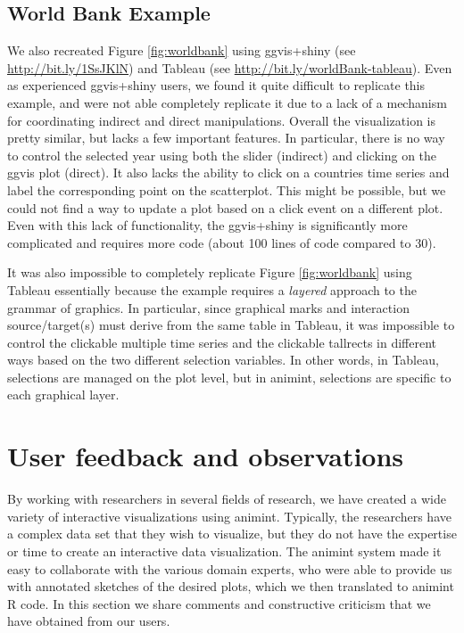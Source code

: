 \documentclass[12pt,]{article}
\theoremstyle{definition}
\theoremstyle{definition}
\theoremstyle{remark}
\begin{document}
\subsection{World Bank Example}\label{world-bank-example}

We also recreated Figure \ref{fig:worldbank} using ggvis+shiny (see
\url{http://bit.ly/1SsJKlN}) and Tableau (see
\url{http://bit.ly/worldBank-tableau}). Even as experienced ggvis+shiny
users, we found it quite difficult to replicate this example, and were
not able completely replicate it due to a lack of a mechanism for
coordinating indirect and direct manipulations. Overall the
visualization is pretty similar, but lacks a few important features. In
particular, there is no way to control the selected year using both the
slider (indirect) and clicking on the ggvis plot (direct). It also lacks
the ability to click on a countries time series and label the
corresponding point on the scatterplot. This might be possible, but we
could not find a way to update a plot based on a click event on a
different plot. Even with this lack of functionality, the ggvis+shiny is
significantly more complicated and requires more code (about 100 lines
of code compared to 30).

It was also impossible to completely replicate Figure
\ref{fig:worldbank} using Tableau essentially because the example
requires a \emph{layered} approach to the grammar of graphics. In
particular, since graphical marks and interaction source/target(s) must
derive from the same table in Tableau, it was impossible to control the
clickable multiple time series and the clickable tallrects in different
ways based on the two different selection variables. In other words, in
Tableau, selections are managed on the plot level, but in animint,
selections are specific to each graphical layer.

\section{User feedback and
observations}\label{user-feedback-and-observations}

By working with researchers in several fields of research, we have
created a wide variety of interactive visualizations using animint.
Typically, the researchers have a complex data set that they wish to
visualize, but they do not have the expertise or time to create an
interactive data visualization. The animint system made it easy to
collaborate with the various domain experts, who were able to provide us
with annotated sketches of the desired plots, which we then translated
to animint R code. In this section we share comments and constructive
criticism that we have obtained from our users.
\end{document}
